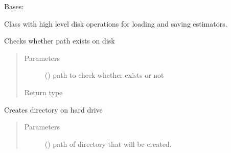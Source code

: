 \documentclass[letterpaper,10pt,english]{sphinxmanual}
\begin{document}
\begin{fulllineitems}
\label{\detokenize{shared:mleap.shared.files_io.DiskOperations}}
Bases: 

Class with high level disk operations for loading and saving estimators.

\begin{fulllineitems}
\label{\detokenize{shared:mleap.shared.files_io.DiskOperations.check_path_exists}}
Checks whether path exists on disk
\begin{quote}\begin{description}
\item[{Parameters}] \leavevmode
{} () \textendash{} path to check whether exists or not

\item[{Return type}] \leavevmode
{}

\end{description}\end{quote}

\end{fulllineitems}


\begin{fulllineitems}
\label{\detokenize{shared:mleap.shared.files_io.DiskOperations.create_directory_on_hdd}}
Creates directory on hard drive
\begin{quote}\begin{description}
\item[{Parameters}] \leavevmode
{} () \textendash{} path of directory that will be created.

\end{description}\end{quote}

\end{fulllineitems}



\end{fulllineitems}
\end{document}
